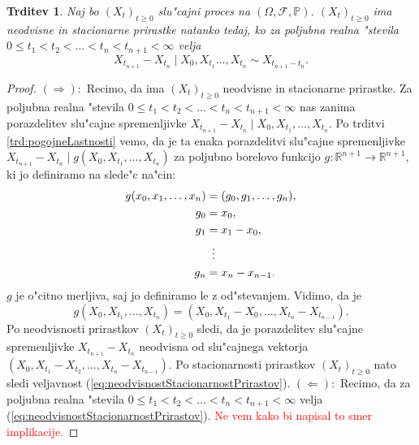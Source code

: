 \documentclass[12pt, a4paper, reqno]{amsart}
\theoremstyle{definition}
\theoremstyle{plain}
\newtheorem{trditev}[definicija]{Trditev}
\newcommand{\R}{\mathbb{R}}
\newcommand{\F}{\mathcal{F}}
\newcommand{\1}{\mathds{1}}
\newcommand*{\refPriloga}[1]{%
  \begingroup
    \hypersetup{
      linkcolor=red,
      linkbordercolor=red,
    }%
    \ref{#1}%
  \endgroup
}
\begin{document}
        \pagebreak
        \begin{trditev}
            Naj bo $(X_t)_{t\geq0}$ slu"cajni proces na $(\Omega, \F, \mathbb{P})$. $(X_t)_{t\geq0}$ ima
            neodvisne in stacionarne prirastke natanko tedaj, ko za poljubna realna "stevila
            $0\leq t_1 < t_2 < \ldots < t_n < t_{n+1} < \infty$ velja 
            \begin{equation}
                X_{t_{n+1}} - X_{t_n}\mid X_{0}, X_{t_1} \dots, X_{t_n} \sim X_{t_{n+1} - t_n}.
                \label{eq:neodvisnostStacionarnostPrirastov}
            \end{equation}
            \label{trd:neodvisnostStacionarnostPrirastov}
        \end{trditev}

        \begin{proof}
            $(\Rightarrow):$ Recimo, da ima $(X_t)_{t\geq0}$ neodvisne in stacionarne prirastke. Za 
            poljubna realna "stevila $0\leq t_1 < t_2 < \ldots < t_n < t_{n+1} < \infty$ nas zanima porazdelitev 
            slu"cajne spremenljivke $X_{t_{n+1}} - X_{t_n}\mid X_{0}, X_{t_1}, \dots, X_{t_n}$.
            Po trditvi \refPriloga{trd:pogojneLastnosti} vemo, da je ta enaka porazdelitvi slu"cajne spremenljivke
            $X_{t_{n+1}} - X_{t_n}\mid g(X_0, X_{t_1}, \dots, X_{t_n})$ za poljubno borelovo funkcijo $g:\R^{n+1}\to \R^{n+1}$,
            ki jo definiramo na slede"c na"cin:
            \begin{align*}
                g(x_0, x_1, \dots, x_n) &= (g_0, g_1, \dots, g_n),\\
                                    g_0 &= x_0, \\
                                    g_1 &= x_1 - x_0, \\
                                    &\mathrel{\makebox[\widthof{=}]{\vdots}} \\
                                    g_n &= x_n - x_{n-1}.
            \end{align*}
            $g$ je o"citno merljiva, saj jo definiramo le z od"stevanjem.
            Vidimo, da je 
            $$g(X_0, X_{t_1}, \dots, X_{t_n}) = (X_0, X_{t_1} - X_0, \dots, X_{t_n} - X_{t_{n-1}}).$$ 
            Po neodvisnosti prirastkov $(X_t)_{t\geq0}$ sledi, da je porazdelitev slu"cajne 
            spremenljivke $X_{t_{n+1}} - X_{t_n}$ neodvisna od slu"cajnega vektorja
            $(X_0, X_{t_1} - X_{t_2}, \dots, X_{t_n} - X_{t_{n-1}})$. Po stacionarnosti prirastkov $(X_t)_{t\geq0}$ nato sledi 
            veljavnost (\ref{eq:neodvisnostStacionarnostPrirastov}). \newline
            \noindent
            $(\Leftarrow):$ Recimo, da za poljubna realna "stevila $0\leq t_1 < t_2 < \ldots < t_n < t_{n+1} < \infty$ velja
            (\ref{eq:neodvisnostStacionarnostPrirastov}).
            \textcolor{red}{Ne vem kako bi napisal to smer implikacije.}
        \end{proof}
\end{document}
